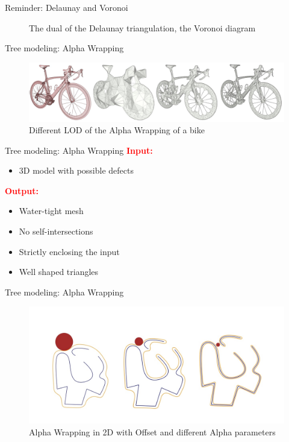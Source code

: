 \documentclass[10pt]{beamer}
\begin{document}
\begin{frame}{Reminder: Delaunay and Voronoi}
\begin{figure}[H]
\begin{minipage}{0.49\textwidth}
        \caption{The dual of the Delaunay triangulation, the Voronoi diagram\cite{delaunay-wiki}}
    \end{minipage}
  \end{figure}
\end{frame}

\begin{frame}{Tree modeling: Alpha Wrapping}
  \begin{figure}[H]
    \centering
        \centering
        \includegraphics[width=\textwidth]{images/aw3_bike_lod.jpg}
        \caption{Different LOD of the Alpha Wrapping of a bike\cite{cgal_alpha_wrapper}}
\end{figure}
\end{frame}

\begin{frame}{Tree modeling: Alpha Wrapping}
  \Large
  \textcolor{red}{\textbf{Input:}}
    \begin{itemize}
    \item  3D model with possible defects
    \end{itemize}
    \textcolor{red}{\textbf{Output:} }
    \begin{itemize}
      \item Water-tight mesh
      \item No self-intersections
      \item Strictly enclosing the input
      \item Well shaped triangles
    \end{itemize}
\end{frame}


\begin{frame}{Tree modeling: Alpha Wrapping}
  \Large
  \begin{figure}[H]
    \centering
    \includegraphics[width=\textwidth]{images/alpha-wrapping_ball.jpg}
    \caption{Alpha Wrapping in 2D with Offset and different Alpha parameters}
\end{figure}
\end{frame}
\end{document}
